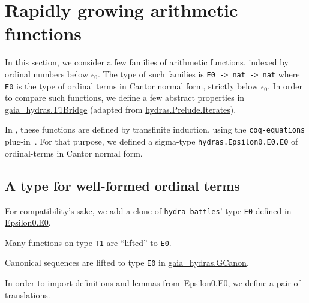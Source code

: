 \section{Rapidly growing arithmetic functions}

In this section, we consider a few families of arithmetic functions, indexed by ordinal numbers below $\epsilon_0$.
The type of such families is \texttt{E0 -> nat -> nat} where
\texttt{E0} is the type of ordinal terms in Cantor normal form, strictly below $\epsilon_0$.
In order to compare such functions, we define a few abstract properties in
\href{../theories/html/gaia_hydras.T1Bridge.html}{gaia\_hydras.T1Bridge} (adapted from 
\href{../theories/html/hydras.Prelude.Iterates.html}{hydras.Prelude.Iterates}).









In \HydrasLib, these functions are defined by transfinite induction, using the \texttt{coq-equations} plug-in~\cite{sozeau:hal-01671777}. For that purpose, we defined a sigma-type
\texttt{hydras.Epsilon0.E0.E0} of ordinal-terms in Cantor normal form. 


\subsection{A type for well-formed ordinal terms}
\label{sect:E0-gaia-hydras}
For compatibility's sake, we add a clone of \texttt{hydra-battles}' type \texttt{E0} defined in \href{../theories/html/hydras.Epsilon0.E0.html}{Epsilon0.E0}.


Many functions on type \texttt{T1} are ``lifted'' to \texttt{E0}.



Canonical sequences are lifted to type \texttt{E0} in
\href{../theories/html/gaia_hydras.GCanon.html}{gaia\_hydras.GCanon}.



In order to import definitions and lemmas
from~\href{../theories/html/hydras.Epsilon0.E0.html}{Epsilon0.E0}, we define a pair of translations.


